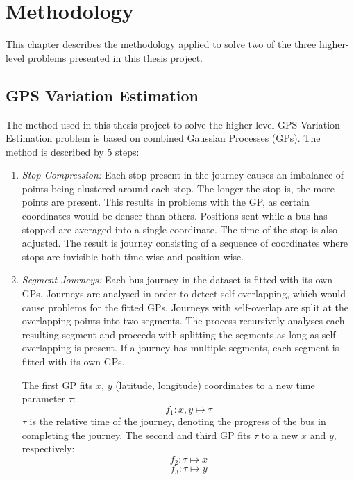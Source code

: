 \chapter{Methodology}
\label{cha:methodology}

This chapter describes the methodology applied to solve two of the three higher-level problems presented in this thesis project.

\section{GPS Variation Estimation}
The method used in this thesis project to solve the higher-level GPS Variation Estimation problem is based on combined Gaussian Processes (GPs).
The method is described by 5 steps:

\begin{enumerate}
    \item \textit{Stop Compression:}
    Each stop present in the journey causes an imbalance of points being clustered around each stop.
    The longer the stop is, the more points are present.
    This results in problems with the GP, as certain coordinates would be denser than others.
    Positions sent while a bus has stopped are averaged into a single coordinate.
    The time of the stop is also adjusted.
    The result is journey consisting of a sequence of coordinates where stops are invisible both time-wise and position-wise.

    \item \textit{Segment Journeys:}
    Each bus journey in the dataset is fitted with its own GPs.
    Journeys are analysed in order to detect self-overlapping, which would cause problems for the fitted GPs.
    Journeys with self-overlap are split at the overlapping points into two segments.
    The process recursively analyses each resulting segment and proceeds with splitting the segments as long as self-overlapping is present.
    If a journey has multiple segments, each segment is fitted with its own GPs.

    The first GP fits $x$, $y$ (latitude, longitude) coordinates to a new time parameter $\tau$:
    \begin{equation} \label{eq:gps-var-f1}
       f_1: x, y \longmapsto \tau
    \end{equation}
    $\tau$ is the relative time of the journey, denoting the progress of the bus in completing the journey.
    The second and third GP fits $\tau$ to a new $x$ and $y$, respectively:
    \begin{equation} \label{eq:gps-var-f2}
        f_2: \tau \longmapsto x
    \end{equation}
    \begin{equation} \label{eq:gps-var-f3}
        f_3: \tau \longmapsto y
    \end{equation}


\end{enumerate}
